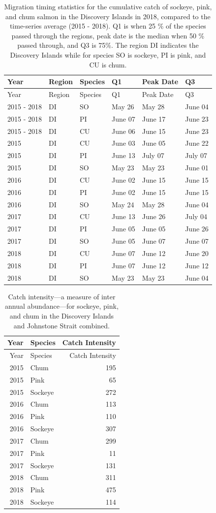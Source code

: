 \documentclass[fleqn,10pt]{wlpeerj} %
\begin{document}
\begin{longtable}[]{@{}llllll@{}}
\caption{\label{tab:migration-timing-table} Migration timing statistics for
the cumulative catch of sockeye, pink, and chum salmon in the Discovery
Islands in 2018, compared to the time-series average (2015 - 2018). Q1
is when 25 \% of the species passed through the regions, peak date is
the median when 50 \% passed through, and Q3 is 75\%. The region DI
indicates the Discovery Islands while for species SO is sockeye, PI is
pink, and CU is chum.}\tabularnewline
\toprule
Year & Region & Species & Q1 & Peak Date & Q3\tabularnewline
\midrule
\endfirsthead
\toprule
Year & Region & Species & Q1 & Peak Date & Q3\tabularnewline
\midrule
\endhead
2015 - 2018 & DI & SO & May 26 & May 28 & June 04\tabularnewline
2015 - 2018 & DI & PI & June 07 & June 17 & June 23\tabularnewline
2015 - 2018 & DI & CU & June 06 & June 15 & June 23\tabularnewline
2015 & DI & CU & June 03 & June 05 & June 22\tabularnewline
2015 & DI & PI & June 13 & July 07 & July 07\tabularnewline
2015 & DI & SO & May 23 & May 23 & June 01\tabularnewline
2016 & DI & CU & June 02 & June 15 & June 15\tabularnewline
2016 & DI & PI & June 02 & June 15 & June 15\tabularnewline
2016 & DI & SO & May 24 & May 28 & June 04\tabularnewline
2017 & DI & CU & June 13 & June 26 & July 04\tabularnewline
2017 & DI & PI & June 05 & June 05 & June 26\tabularnewline
2017 & DI & SO & June 05 & June 07 & June 07\tabularnewline
2018 & DI & CU & June 07 & June 12 & June 20\tabularnewline
2018 & DI & PI & June 07 & June 12 & June 12\tabularnewline
2018 & DI & SO & May 23 & May 23 & June 04\tabularnewline
\bottomrule
\end{longtable}

\begin{longtable}[]{@{}rlr@{}}
\caption{\label{tab:catch-intensity-table} Catch intensity---a measure of
inter annual abundance---for sockeye, pink, and chum in the Discovery
Islands and Johnstone Strait combined.}\tabularnewline
\toprule
Year & Species & Catch Intensity\tabularnewline
\midrule
\endfirsthead
\toprule
Year & Species & Catch Intensity\tabularnewline
\midrule
\endhead
2015 & Chum & 195\tabularnewline
2015 & Pink & 65\tabularnewline
2015 & Sockeye & 272\tabularnewline
2016 & Chum & 113\tabularnewline
2016 & Pink & 110\tabularnewline
2016 & Sockeye & 307\tabularnewline
2017 & Chum & 299\tabularnewline
2017 & Pink & 11\tabularnewline
2017 & Sockeye & 131\tabularnewline
2018 & Chum & 311\tabularnewline
2018 & Pink & 475\tabularnewline
2018 & Sockeye & 114\tabularnewline
\bottomrule
\end{longtable}
\end{document}
